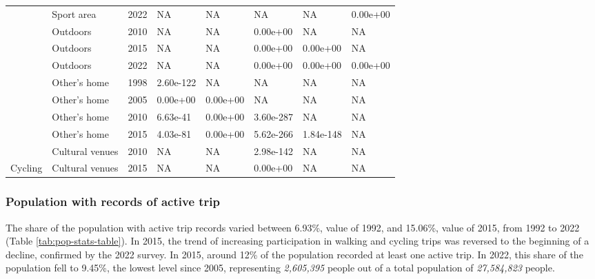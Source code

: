 \documentclass[preprint, 3p,
authoryear]{elsarticle} %
\begin{document}
\begin{table}
{\begin{tabular}[t]{llllllll}
 & Sport area & 2022 & NA & NA & NA & NA & 0.00e+00\\

 & Outdoors & 2010 & NA & NA & 0.00e+00 & NA & NA\\

 & Outdoors & 2015 & NA & NA & 0.00e+00 & 0.00e+00 & NA\\

 & Outdoors & 2022 & NA & NA & 0.00e+00 & 0.00e+00 & 0.00e+00\\

 & Other's home & 1998 & 2.60e-122 & NA & NA & NA & NA\\

 & Other's home & 2005 & 0.00e+00 & 0.00e+00 & NA & NA & NA\\

 & Other's home & 2010 & 6.63e-41 & 0.00e+00 & 3.60e-287 & NA & NA\\

 & Other's home & 2015 & 4.03e-81 & 0.00e+00 & 5.62e-266 & 1.84e-148 & NA\\

 & Cultural venues & 2010 & NA & NA & 2.98e-142 & NA & NA\\

\multirow[t]{-27}{*}{\raggedright\arraybackslash Cycling} & Cultural venues & 2015 & NA & NA & 0.00e+00 & NA & NA\\
\bottomrule
\end{tabular}}
\end{table}

\subsubsection{Population with records of active
trip}\label{population-with-records-of-active-trip}

The share of the population with active trip records varied between
6.93\%, value of 1992, and 15.06\%, value of 2015, from 1992 to 2022
(Table \ref{tab:pop-stats-table}). In 2015, the trend of increasing
participation in walking and cycling trips was reversed to the beginning
of a decline, confirmed by the 2022 survey. In 2015, around 12\% of the
population recorded at least one active trip. In 2022, this share of the
population fell to 9.45\%, the lowest level since 2005, representing
\emph{2,605,395} people out of a total population of \emph{27,584,823}
people.

\begingroup\fontsize{5.5}{7.5}\selectfont
\end{document}

